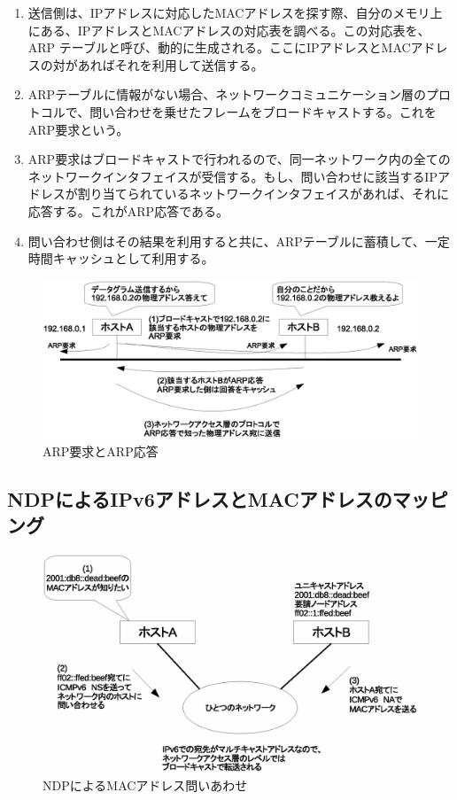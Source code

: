 \begin{enumerate}
\item 送信側は、IPアドレスに対応したMACアドレスを探す際、自分のメモリ上にある、IPアドレスとMACアドレスの対応表を調べる。この対応表を、ARP テーブルと呼び、動的に生成される。ここにIPアドレスとMACアドレスの対があればそれを利用して送信する。
\item ARPテーブルに情報がない場合、ネットワークコミュニケーション層のプロトコルで、問い合わせを乗せたフレームをブロードキャストする。これをARP要求という。
\item ARP要求はブロードキャストで行われるので、同一ネットワーク内の全てのネットワークインタフェイスが受信する。もし、問い合わせに該当するIPアドレスが割り当てられているネットワークインタフェイスがあれば、それに応答する。これがARP応答である。
\item 問い合わせ側はその結果を利用すると共に、ARPテーブルに蓄積して、一定時間キャッシュとして利用する。
\end{enumerate}


\begin{figure}[htbp]
	\includegraphics[width=12cm,clip]{draw/arp.eps}
	\caption{ARP要求とARP応答}
	\label{fig:arp}
\end{figure}


\subsection{NDPによるIPv6アドレスとMACアドレスのマッピング}
\begin{figure}[htbp]
	\includegraphics[width=12cm,clip]{draw/ndp.eps}
	\caption{NDPによるMACアドレス問いあわせ}
	\label{fig:NDP}
\end{figure}

